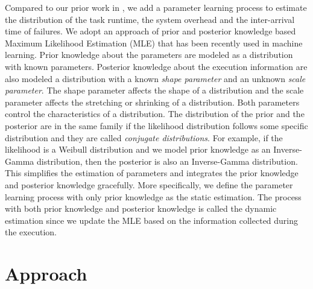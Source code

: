 Compared to our prior work in \cite{Chen2012}, we add a parameter learning process to estimate the distribution of the task runtime, the system overhead and the inter-arrival time of failures. We adopt an approach of prior and posterior knowledge based Maximum Likelihood Estimation (MLE) that has been recently used in machine learning. Prior knowledge about the parameters are modeled as a distribution with known parameters. Posterior knowledge about the execution information are also modeled a distribution with a known \emph{shape parameter} and an unknown \emph{scale parameter}. The shape parameter affects the shape of a distribution and the scale parameter affects the stretching or shrinking of a distribution. Both parameters control the characteristics of a distribution. The distribution of the prior and the posterior are in the same family if the likelihood distribution follows some specific distribution and they are called \emph{conjugate distributions}. For example, if the likelihood is a Weibull distribution and we model prior knowledge as an Inverse-Gamma distribution, then the posterior is also an Inverse-Gamma distribution. This simplifies the estimation of parameters and integrates the prior knowledge and posterior knowledge gracefully. More specifically, we define the parameter learning process with only prior knowledge as the static estimation. The process with both prior knowledge and posterior knowledge is called the dynamic estimation since we update the MLE based on the information collected during the execution.  



\section{Approach}


